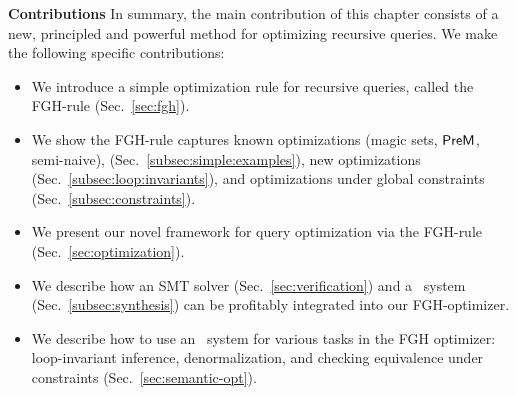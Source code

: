 % 

{\bf Contributions} In summary, the main contribution of this chapter
consists of a new, principled and powerful method for optimizing
recursive queries.  We make the following specific contributions:
%
\begin{itemize}
\item We introduce a simple optimization rule for recursive queries,
  called the FGH-rule (Sec.~\ref{sec:fgh}).
\item We show the FGH-rule captures known optimizations (magic
  sets, $\textsf{PreM}$, semi-naive), (Sec.~\ref{subsec:simple:examples}), 
  new optimizations (Sec.~\ref{subsec:loop:invariants}), and
  optimizations under global constraints
  (Sec.~\ref{subsec:constraints}).
\item We present our novel framework for query optimization via
the FGH-rule  (Sec.~\ref{sec:optimization}).
\item We describe how an SMT solver
(Sec.~\ref{sec:verification}) and a
\cegis\ system (Sec.~\ref{subsec:synthesis})
can be profitably integrated into our FGH-optimizer.
\item We describe how to use an \eqsat\ system for various tasks in
  the FGH optimizer: loop-invariant inference, denormalization,
  and checking equivalence under constraints (Sec.~\ref{sec:semantic-opt}).
\end{itemize}

